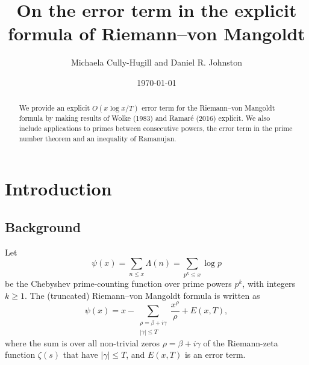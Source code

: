 \documentclass[reqno]{amsart}
\numberwithin{equation}{section}
\theoremstyle{remark}
\begin{document}
\title[The error term in the explicit formula of Riemann--von Mangoldt]{On the error term in the explicit formula of Riemann--von Mangoldt}

\author{Michaela Cully-Hugill and Daniel R. Johnston}
\address{School of Science, UNSW Canberra, Australia}
\address{School of Science, UNSW Canberra, Australia}
\date\today
\keywords{}

\begin{abstract}
    We provide an explicit $O(x\log x/T)$ error term for the Riemann--von Mangoldt formula by making results of Wolke (1983) and Ramar\'e (2016) explicit. We also include applications to primes between consecutive powers, the error term in the prime number theorem and an inequality of Ramanujan.
\end{abstract}

\maketitle

\section{Introduction}
\subsection{Background}
Let
\begin{equation*}
    \psi(x)=\sum_{n\leq x}\Lambda(n)=\sum_{p^k\leq x}\log p
\end{equation*}
be the Chebyshev prime-counting function over prime powers $p^k$, with integers $k\geq 1$. The (truncated) Riemann--von Mangoldt formula is written as
\begin{equation}\label{riemannvoneq}
    \psi(x)=x-\sum_{\substack{\rho=\beta+i\gamma\\|\gamma|\leq T}}\frac{x^\rho}{\rho}+E(x,T),
\end{equation}
where the sum is over all non-trivial zeros $\rho=\beta+i\gamma$ of the Riemann-zeta function $\zeta(s)$ that have $|\gamma|\leq T$, and $E(x,T)$ is an error term. 
\end{document}
